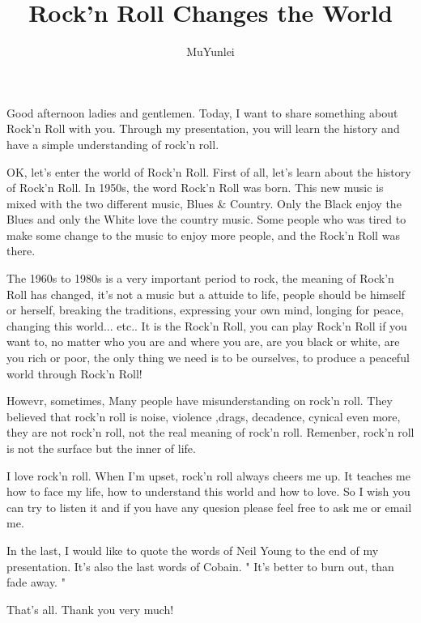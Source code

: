 \documentclass{article}
\title{Rock'n Roll Changes the World}
\author{MuYunlei}
\begin{document}
\maketitle

Good afternoon ladies and gentlemen. Today, I want to share something about Rock'n Roll with you. Through my presentation, you will learn the history and have a simple understanding of rock'n roll. 

OK, let's enter the world of Rock'n Roll. First of all, let's learn about the history of Rock'n Roll. In 1950s, the word Rock'n Roll was born. This new music is mixed with the two different music, Blues \& Country. Only the Black enjoy the Blues and only the White love the country music. Some people who was tired to make some change to the music to enjoy more people, and the Rock'n Roll was there. 

The 1960s to 1980s is a very important period to rock, the meaning of Rock'n Roll has changed, it's not a music but a attuide to life, people should be himself or herself, breaking the traditions, expressing your own mind, longing for peace, changing this world... etc.. It is the Rock'n Roll, you can play Rock'n Roll if you want to, no matter who you are and where you are, are you black or white, are you rich or poor, the only thing we need is to be ourselves, to produce a peaceful world through Rock'n Roll! 

Howevr, sometimes, Many people have misunderstanding on rock'n roll. They believed that rock'n roll is noise, violence ,drags, decadence, cynical even more, they are not rock'n roll, not the real meaning of rock'n roll. Remenber, rock'n roll is not the surface but the inner of life.

I love rock'n roll. When I'm upset, rock'n roll always cheers me up. It teaches me how to face my life, how to understand this world and how to love. So I wish you can try to listen it and if you have any quesion please feel free to ask me or email me.

In the last, I would like to quote the words of Neil Young to the end of my presentation. It's also the last words of Cobain. " It's better to burn out, than fade away. " 

That's all. Thank you very much!
\end{document}

